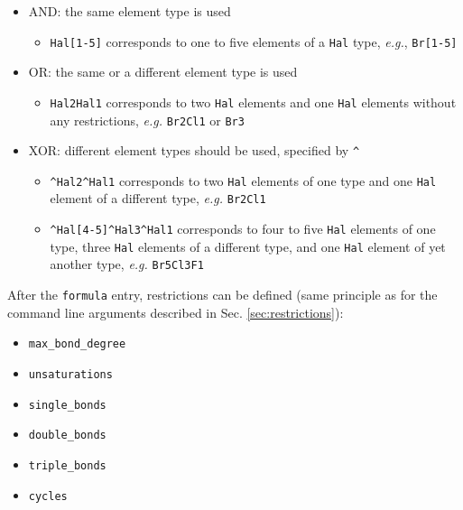 \documentclass[a4paper,11pt]{article}
\begin{document}
\begin{itemize}
  \item AND: the same element type is used
  \begin{itemize}
    \item \texttt{Hal[1-5]} corresponds to one to five elements of a \texttt{Hal} type, \textit{e.g.}, \texttt{Br[1-5]}
  \end{itemize}
  \item OR: the same or a different element type is used
  \begin{itemize}
    \item \texttt{Hal{\color{red}2}Hal{\color{green}1}} corresponds to {\color{red}two} \texttt{Hal} elements and {\color{green}one} \texttt{Hal} elements without any restrictions, \textit{e.g.} \texttt{Br2Cl1} or \texttt{Br3}
  \end{itemize}
  \item XOR: different element types should be used, specified by \texttt{\^}
  \begin{itemize}
    \item \texttt{\^{}Hal{\color{red}2}\^{}Hal{\color{green}1}} corresponds to {\color{red}two} \texttt{Hal} elements of one type and {\color{green}one} \texttt{Hal} element of a different type, \textit{e.g.} \texttt{Br2Cl1}
    \item \texttt{\^{}Hal{\color{red}[4-5]}\^{}Hal{\color{green}3}\^{}Hal{\color{purple}1}} corresponds to {\color{red}four to five} \texttt{Hal} elements of one type, {\color{green}three} \texttt{Hal} elements of a different type, and {\color{purple}one} \texttt{Hal} element of yet another type, \textit{e.g.} \texttt{Br5Cl3F1}
  \end{itemize}
\end{itemize}

After the \texttt{formula} entry, restrictions can be defined (same principle as for the command line arguments described in Sec. \ref{sec:restrictions}):

\begin{itemize}
  \item \texttt{max\_bond\_degree}
  \item \texttt{unsaturations}
  \item \texttt{single\_bonds}
  \item \texttt{double\_bonds}
  \item \texttt{triple\_bonds}
  \item \texttt{cycles}
\end{itemize}
\end{document}
